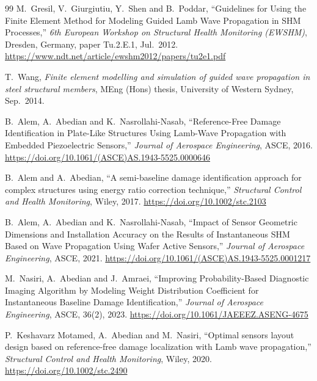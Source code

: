 \begin{thebibliography}{99}
M.~Gresil, V.~Giurgiutiu, Y.~Shen and B.~Poddar, ``Guidelines for Using the Finite Element Method for
Modeling Guided Lamb Wave Propagation in SHM Processes,'' \emph{6th European Workshop on Structural
Health Monitoring (EWSHM)}, Dresden, Germany, paper Tu.2.E.1, Jul.~2012.
\url{https://www.ndt.net/article/ewshm2012/papers/tu2e1.pdf}

T.~Wang, \emph{Finite element modelling and simulation of guided wave propagation in steel structural
members}, MEng (Hons) thesis, University of Western Sydney, Sep.~2014.

B.~Alem, A.~Abedian and K.~Nasrollahi-Nasab, ``Reference-Free Damage Identification in Plate-Like
Structures Using Lamb-Wave Propagation with Embedded Piezoelectric Sensors,'' \emph{Journal of Aerospace
Engineering}, ASCE, 2016. \url{https://doi.org/10.1061/(ASCE)AS.1943-5525.0000646}

B.~Alem and A.~Abedian, ``A semi-baseline damage identification approach for complex structures using
energy ratio correction technique,'' \emph{Structural Control and Health Monitoring}, Wiley, 2017.
\url{https://doi.org/10.1002/stc.2103}

B.~Alem, A.~Abedian and K.~Nasrollahi-Nasab, ``Impact of Sensor Geometric Dimensions and Installation
Accuracy on the Results of Instantaneous SHM Based on Wave Propagation Using Wafer Active Sensors,''
\emph{Journal of Aerospace Engineering}, ASCE, 2021.
\url{https://doi.org/10.1061/(ASCE)AS.1943-5525.0001217}

M.~Nasiri, A.~Abedian and J.~Amraei, ``Improving Probability-Based Diagnostic Imaging Algorithm by
Modeling Weight Distribution Coefficient for Instantaneous Baseline Damage Identification,'' \emph{Journal of
Aerospace Engineering}, ASCE, 36(2), 2023. \url{https://doi.org/10.1061/JAEEEZ.ASENG-4675}

P.~Keshavarz Motamed, A.~Abedian and M.~Nasiri, ``Optimal sensors layout design based on reference-free
damage localization with Lamb wave propagation,'' \emph{Structural Control and Health Monitoring}, Wiley,
2020. \url{https://doi.org/10.1002/stc.2490}

\end{thebibliography}
